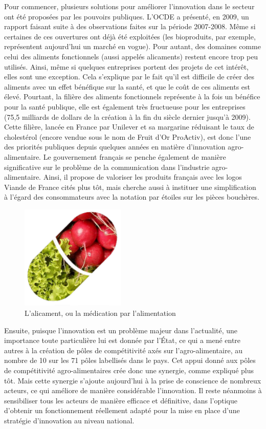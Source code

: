 \documentclass[a4paper,12pt]{report}
\begin{document}
			Pour commencer, plusieurs solutions pour améliorer l’innovation dans le secteur ont été proposées par les pouvoirs publiques. L’OCDE a présenté, en 2009, un rapport \cite{OECD} faisant suite à des observations faites sur la période 2007-2008. Même si certaines de ces ouvertures ont déjà été exploitées (les bioproduits, par exemple, représentent aujourd’hui un marché en vogue). Pour autant, des domaines comme celui des aliments fonctionnels (aussi appelés alicaments) restent encore trop peu utilisés. Ainsi, même si quelques entreprises portent des projets de cet intérêt, elles sont une exception. Cela s’explique par le fait qu’il est difficile de créer des aliments avec un effet bénéfique sur la santé, et que le coût de ces aliments est élevé. Pourtant, la filière des aliments fonctionnels représente à la fois un bénéfice pour la santé publique, elle est également très fructueuse pour les entreprises (75,5 milliards de dollars de la création à la fin du siècle dernier jusqu’à 2009). Cette filière, lancée en France par Unilever et sa margarine réduisant le taux de cholestérol (encore vendue sous le nom de Fruit d’Or ProActiv)\cite{FruitDOr}, est donc l’une des priorités publiques depuis quelques années en matière d’innovation agro-alimentaire. Le gouvernement français se penche également de manière significative sur le problème de la communication dans l’industrie agro-alimentaire. Ainsi, il propose de valoriser les produits français avec les logos Viande de France cités plus tôt, mais cherche aussi à instituer une simplification à l’égard des consommateurs avec la notation par étoiles sur les pièces bouchères\cite{EtoilesViande}. 

			\begin{figure}[!h]
\centering
			\includegraphics[width=5cm]{Illustrations/Alicament.png}
			\caption{L'alicament, ou la médication par l'alimentation}
			\label{alicament}
			\end{figure}
			
			

			Ensuite, puisque l’innovation est un problème majeur dans l’actualité, une importance toute particulière lui est donnée par l’État, ce qui a mené entre autres à la création de pôles de compétitivité axés sur l’agro-alimentaire, au nombre de 10 sur les 71 pôles labellisés dans le pays\cite{CompetitiviteGouv}. Cet appui donné aux pôles de compétitivité agro-alimentaires crée donc une synergie, comme expliqué plus tôt. Mais cette synergie s’ajoute aujourd’hui à la prise de conscience de nombreux acteurs, ce qui améliore de manière considérable l’innovation. Il reste néanmoins à sensibiliser tous les acteurs de manière efficace et définitive, dans l’optique d’obtenir un fonctionnement réellement adapté pour la mise en place d’une stratégie d’innovation au niveau national.
\end{document}
